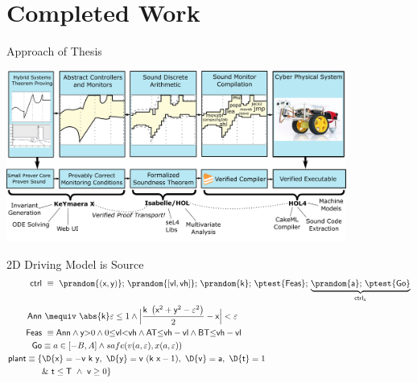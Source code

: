 \documentclass[slidestop,aspectratio=169]{beamer}
\newcommand{\xgvar}{\textsf{x}}
\newcommand{\ygvar}{\textsf{y}}
\newcommand{\kvar}{\textsf{k}}
\newcommand{\tvar}{\textsf{t}}
\newcommand{\vlvar}{\textsf{vl}}
\newcommand{\vhvar}{\textsf{vh}}
\newcommand{\Tvar}{{\sf T}\xspace}
\newcommand{\Avar}{{\sf A}\xspace}
\newcommand{\Bvar}{{\sf B}\xspace}
\newcommand{\vvar}{{\sf v}\xspace}
\newcommand{\avar}{{\sf a}\xspace}
\newcommand{\ctrl}{\textsf{ctrl}\xspace}
\newcommand{\ctrlliv}{\ctrl_{\text{a}}}
\newcommand{\plant}{\textsf{plant}\xspace}
\theoremstyle{plain}
\theoremstyle{definition}
\theoremstyle{remark}
\begin{document}
\section{Completed Work}
%
\begin{frame}[t]{Approach of Thesis}
\begin{center}
  \includegraphics[width=4.4in]{img/veriphy-overview.png}
\end{center}
\end{frame}

\begin{frame}[t]{2D Driving Model is Source}
\newcommand{\admiss}{\textsf{Go}} %
\newcommand{\planreq}{\textsf{Feas}} %
\newcommand{\veps}{\varepsilon}
\newcommand{\annul}{\textsf{Ann}\xspace}
\newcommand{\adjustSpeedDist}{\delta_\mathsf{Lim}\xspace}
\newcommand{\controllableGoalDist}{\mathsf{Lim}}
{\small\begin{align*}
\ctrl &~\equiv~ \prandom{(\xgvar,\ygvar)};\,\prandom{[\vlvar,\vhvar]};\,\prandom{\kvar};\,\ptest{\planreq};\,\underbrace{\prandom{\avar};\,\ptest{\admiss}}_{\ctrlliv}\\
\annul &~\mequiv~\abs{\kvar}\veps \leq 1 \land \Big|\frac{ \kvar~\left(\xgvar^2 +\ygvar^2 - \veps^2 \right)}{2} - \xgvar\Big| < \veps\\
\label{eq:planReq} \planreq &~\equiv \annul \land \ygvar{>}0 \land 0{\leq}\vlvar{<}\vhvar \land \Avar\Tvar{\leq}\vhvar-\vlvar \land \Bvar\Tvar{\leq}\vhvar-\vlvar\\
\admiss &\equiv a \in [-B,A] \land safe(v(a,\veps),x(a,\veps))\\
\plant\equiv \{&\D{\xgvar}=-\vvar~\kvar~\ygvar,~\D{\ygvar}=\vvar~(\kvar~\xgvar-1),~\D{\vvar}=\avar,~\D{\tvar}=1 \\
 &\&~\tvar\leq \Tvar ~\land~ \vvar \geq 0\} %
\end{align*}}


\end{frame}
\end{document}
